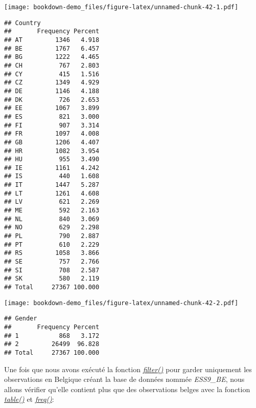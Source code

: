 \documentclass[
]{book}
\newenvironment{Shaded}{\begin{snugshade}}{\end{snugshade}}
\newcommand{\CommentTok}[1]{\textcolor[rgb]{0.56,0.35,0.01}{\textit{#1}}}
\newcommand{\FunctionTok}[1]{\textcolor[rgb]{0.00,0.00,0.00}{#1}}
\newcommand{\NormalTok}[1]{#1}
\newcommand{\OtherTok}[1]{\textcolor[rgb]{0.56,0.35,0.01}{#1}}
\newcommand{\SpecialCharTok}[1]{\textcolor[rgb]{0.00,0.00,0.00}{#1}}
\newcommand{\StringTok}[1]{\textcolor[rgb]{0.31,0.60,0.02}{#1}}
\begin{document}
\texttt{[image: bookdown-demo\_files/figure-latex/unnamed-chunk-42-1.pdf]}

\begin{verbatim}
## Country 
##       Frequency Percent
## AT         1346   4.918
## BE         1767   6.457
## BG         1222   4.465
## CH          767   2.803
## CY          415   1.516
## CZ         1349   4.929
## DE         1146   4.188
## DK          726   2.653
## EE         1067   3.899
## ES          821   3.000
## FI          907   3.314
## FR         1097   4.008
## GB         1206   4.407
## HR         1082   3.954
## HU          955   3.490
## IE         1161   4.242
## IS          440   1.608
## IT         1447   5.287
## LT         1261   4.608
## LV          621   2.269
## ME          592   2.163
## NL          840   3.069
## NO          629   2.298
## PL          790   2.887
## PT          610   2.229
## RS         1058   3.866
## SE          757   2.766
## SI          708   2.587
## SK          580   2.119
## Total     27367 100.000
\end{verbatim}

\begin{Shaded}
\end{Shaded}

\texttt{[image: bookdown-demo\_files/figure-latex/unnamed-chunk-42-2.pdf]}

\begin{verbatim}
## Gender 
##       Frequency Percent
## 1           868   3.172
## 2         26499  96.828
## Total     27367 100.000
\end{verbatim}

Une fois que nous avons exécuté la fonction \href{https://dplyr.tidyverse.org/reference/filter.html}{\emph{filter()}} pour garder uniquement les observations en Belgique créant la base de données nommée \emph{ESS9\_BE}, nous allons vérifier qu'elle contient plus que des observations belges avec la fonction \href{https://www.rdocumentation.org/packages/base/versions/3.6.2/topics/table}{\emph{table()}} et \href{https://www.rdocumentation.org/packages/descr/versions/1.1.5/topics/freq}{\emph{freq()}}:

\begin{Shaded}
\end{Shaded}
\end{document}
